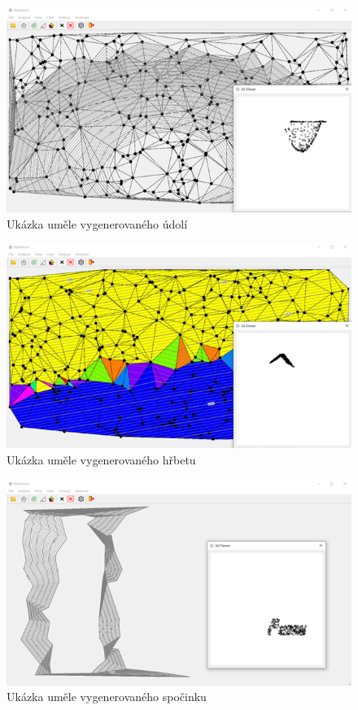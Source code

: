 \begin{figure}[H]
    \centering
    \includegraphics[width=\textwidth]{images/ukazka_udoli.png}
    \caption{Ukázka uměle vygenerovaného údolí}
\end{figure}

\begin{figure}[H]
    \centering
    \includegraphics[width=\textwidth]{images/ukazka_hrbet.png}
    \caption{Ukázka uměle vygenerovaného hřbetu}
\end{figure}

\begin{figure}[H]
    \centering
    \includegraphics[width=\textwidth]{images/ukazka_spocinek.png}
    \caption{Ukázka uměle vygenerovaného spočinku}
\end{figure}


